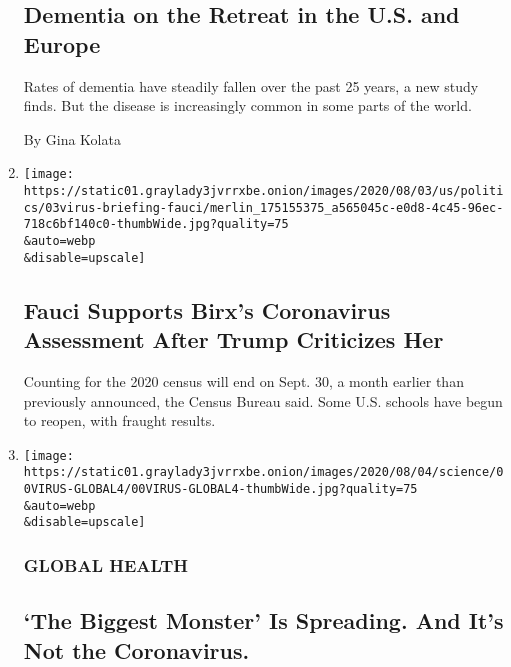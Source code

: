 \begin{enumerate}
  \hypertarget{dementia-on-the-retreat-in-the-us-and-europe}{%
  \subsection{Dementia on the Retreat in the U.S. and
  Europe}\label{dementia-on-the-retreat-in-the-us-and-europe}}

  Rates of dementia have steadily fallen over the past 25 years, a new
  study finds. But the disease is increasingly common in some parts of
  the world.

  By Gina Kolata
\item
  \href{/2020/08/03/world/coronavirus-covid-19.html}{}

  \texttt{[image: https://static01.graylady3jvrrxbe.onion/images/2020/08/03/us/politics/03virus-briefing-fauci/merlin\_175155375\_a565045c-e0d8-4c45-96ec-718c6bf140c0-thumbWide.jpg?quality=75\\\&auto=webp\\\&disable=upscale]}

  \hypertarget{fauci-supports-birxs-coronavirus-assessment-after-trump-criticizes-her}{%
  \subsection{Fauci Supports Birx's Coronavirus Assessment After Trump
  Criticizes
  Her}\label{fauci-supports-birxs-coronavirus-assessment-after-trump-criticizes-her}}

  Counting for the 2020 census will end on Sept. 30, a month earlier
  than previously announced, the Census Bureau said. Some U.S. schools
  have begun to reopen, with fraught results.
\item
  \href{/2020/08/03/health/coronavirus-tuberculosis-aids-malaria.html}{}

  \texttt{[image: https://static01.graylady3jvrrxbe.onion/images/2020/08/04/science/00VIRUS-GLOBAL4/00VIRUS-GLOBAL4-thumbWide.jpg?quality=75\\\&auto=webp\\\&disable=upscale]}

  \hypertarget{global-health}{%
  \subsubsection{GLOBAL HEALTH}\label{global-health}}

  \hypertarget{the-biggest-monster-is-spreading-and-its-not-the-coronavirus}{%
  \subsection{`The Biggest Monster' Is Spreading. And It's Not the
  Coronavirus.}\label{the-biggest-monster-is-spreading-and-its-not-the-coronavirus}}


\end{enumerate}
